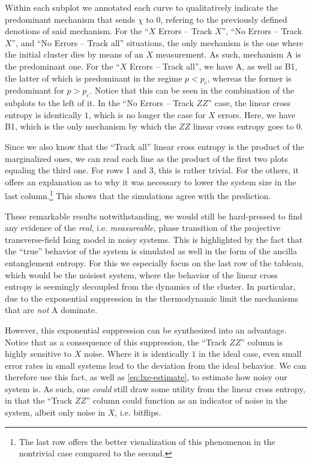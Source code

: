 Within each subplot we annotated each curve to qualitatively indicate the
predominant mechanism that sends $\chi$ to $0$, refering to the previously
defined denotions of said mechanism. For the \enquote{$X$ Errors -- Track $X$},
\enquote{No Errors -- Track $X$}, and \enquote{No Errors -- Track all}
situations, the only mechanism is the one where the initial cluster dies by
means of an $X$ measurement. As such, mechanism \textsf{A} is the predominant
one. For the \enquote{$X$ Errors -- Track all}, we have \textsf{A}, as well as
\textsf{B1}, the latter of which is predominant in the regime $p<p_c$, whereas
the former is predominant for $p> p_c$. Notice that this can be seen in the
combination of the subplots to the left of it. In the \enquote{No Errors --
Track $ZZ$} case, the linear cross entropy is identically $1$, which is no
longer the case for $X$ errors. Here, we have \textsf{B1}, which is the only
mechanism by which the $ZZ$ linear cross entropy goes to 0.

Since we also know that the \enquote{Track all} linear cross entropy is the
product of the marginalized ones, we can read each line as the product of the
first two plots equaling the third one. For rows 1 and 3, this is rather
trivial. For the others, it offers an explanation as to why it was necessary to
lower the system size in the last column.\footnote{The last row offers the
better visualization of this phenomenon in the nontrivial case compared to the
second.} This shows that the simulations agree with the prediction.

These remarkable results notwithstanding, we would still be hard-pressed to
find any evidence of the \emph{real}, i.e. \emph{measureable}, phase transition
of the projective transverse-field Ising model in noisy systems. This is highlighted by the fact
that the \enquote{true} behavior of the system is simulated as well in the form
of the ancilla entanglement entropy. For this we especially focus on the last
row of the tableau, which would be the noisiest system, where the behavior of
the linear cross entropy is seemingly decoupled from the dynamics of the
cluster. In particular, due to the exponential suppression in the
thermodynamic limit the mechanisms that are \emph{not} \textsf{A} dominate.  

However, this exponential suppression can be synthesized
into an advantage. Notice that as a consequence of this
suppression, the \enquote{Track $ZZ$} column is highly sensitive to $X$ noise.
Where it is identically $1$ in the ideal case, even small error rates in small
systems lead to the deviation from the ideal behavior. We can therefore use
this fact, as well as \cref{eq:lxe-estimate}, to estimate how noisy our system
is. As such, one \emph{could} still draw some utility from the linear cross
entropy, in that the \enquote{Track $ZZ$} column could function as an indicator
of noise in the system, albeit only noise in $X$, i.e. bitflips. 

